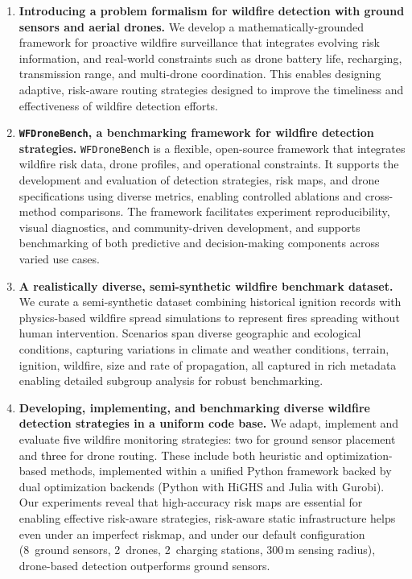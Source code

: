 \documentclass{article}
\newcommand{\blue}[1]{\textcolor{black}{#1}}
\begin{document}

\begin{enumerate}
    \item \textbf{Introducing a problem formalism for wildfire detection with ground sensors and aerial drones.} We develop a mathematically-grounded framework for proactive wildfire surveillance that integrates evolving risk information, and real-world constraints such as drone battery life, recharging, transmission range, and multi-drone coordination. This enables designing adaptive, risk-aware routing strategies designed to improve the timeliness and effectiveness of wildfire detection efforts. 
    \item \textbf{\texttt{WFDroneBench}, a benchmarking framework for wildfire detection strategies.} \texttt{WFDroneBench} is a flexible, open-source framework that integrates wildfire risk data, drone profiles, and operational constraints. It supports the development and evaluation of detection strategies, risk maps, and drone specifications using diverse metrics, enabling controlled ablations and cross-method comparisons. The framework facilitates experiment reproducibility, visual diagnostics, and community-driven development, and supports benchmarking of both predictive and decision-making components across varied use cases.

    \item \textbf{A realistically diverse, semi-synthetic wildfire benchmark dataset.} We curate a semi-synthetic dataset combining historical ignition records with physics-based wildfire spread simulations to represent fires spreading without human intervention. Scenarios span diverse geographic and ecological conditions, capturing variations in climate and weather conditions, terrain, ignition, wildfire, size and rate of propagation, all captured in rich metadata enabling detailed subgroup analysis for robust benchmarking.  
    \item \textbf{Developing, implementing, and benchmarking diverse wildfire detection strategies in a uniform code base.} We adapt, implement and evaluate \blue{five} wildfire monitoring strategies: two for ground sensor placement and \blue{three} for drone routing. These include both heuristic and optimization-based methods, implemented within a unified Python framework backed by dual optimization backends (Python with HiGHS and Julia with Gurobi). Our experiments reveal that high-accuracy risk maps are essential for enabling effective risk-aware strategies, risk-aware static infrastructure helps even under an imperfect riskmap, and under our default configuration (8~ground sensors, 2~drones, 2~charging stations, 300\,m sensing radius), drone-based detection outperforms ground sensors.
\end{enumerate}
\end{document}
